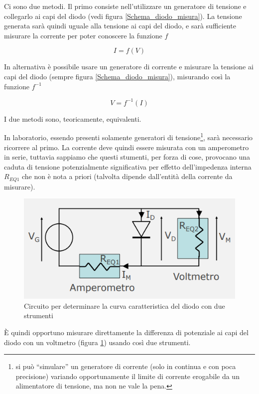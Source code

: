 \documentclass{article}
\begin{document}
Ci sono due metodi. Il primo consiste nell'utilizzare un generatore di tensione e collegarlo ai capi del diodo (vedi figura \ref{Schema_diodo_misura}). La tensione generata sarà quindi uguale alla tensione ai capi del diodo, e sarà sufficiente misurare la corrente per poter conoscere la funzione $f$

\[I = f(V)\]

In alternativa è possibile usare un generatore di corrente e misurare la tensione ai capi del diodo (sempre figura \ref{Schema_diodo_misura}), misurando così la funzione $f^{-1}$

\[V = f^{-1}(I)\]

I due metodi sono, teoricamente, equivalenti. 

\vspace{1mm}

In laboratorio, essendo presenti solamente generatori di tensione\footnote{si può “simulare” un generatore di corrente (solo in continua e con poca precisione) variando opportunamente il limite di corrente erogabile da un alimentatore di tensione, ma non ne vale la pena.}, sarà necessario ricorrere al primo. La corrente deve quindi essere misurata con un amperometro in serie, tuttavia sappiamo che questi stumenti, per forza di cose, provocano una caduta di tensione potenzialmente significativa per effetto dell’impedenza interna $R_{EQ1}$ che non è nota a priori (talvolta dipende dall’entità della corrente da misurare). 

\begin{figure}[h]
  \centering
  \includegraphics[scale=0.7]{IM_diodo_misura_bis}
  \caption{Circuito per determinare la curva caratteristica del diodo con due strumenti}
  \label{Schema_diodo_misura_bis}
\end{figure}

È quindi opportuno misurare direttamente la differenza di potenziale ai capi del diodo con un voltmetro (figura \ref{Schema_diodo_misura_bis}) usando così due strumenti.
\end{document}
